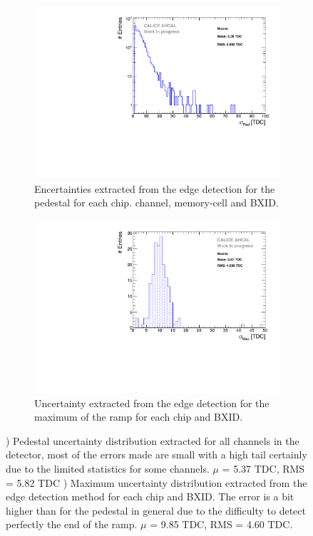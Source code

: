 \begin{figure}[thtbp!]
	\begin{subfigure}[t]{0.49\textwidth}
		\centering
		\includegraphics[width=1\linewidth]{chap5/fig_AHCAL_timing/Muons/PedestalErrorDistribution_AHCAL.pdf}
		\caption{Encertainties extracted from the edge detection for the pedestal for each chip. channel, memory-cell and BXID.} \label{fig:error_ped}
	\end{subfigure}
	\hfill
	\begin{subfigure}[t]{0.49\textwidth}
		\centering
		\includegraphics[width=1\linewidth]{chap5/fig_AHCAL_timing/Muons/MaxErrorDistribution_AHCAL.pdf}
		\caption{Uncertainty extracted from the edge detection for the maximum of the ramp for each chip and BXID.} \label{fig:error_max}
	\end{subfigure}
	\caption{) Pedestal uncertainty distribution extracted for all channels in the detector, most of the errors made are small with a high tail certainly due to the limited statistics for some channels. $\mu$ = 5.37 TDC, RMS = 5.82 TDC ) Maximum uncertainty distribution extracted from the edge detection method for each chip and BXID. The error is a bit higher than for the pedestal in general due to the difficulty to detect perfectly the end of the ramp. $\mu$ = 9.85 TDC, RMS = 4.60 TDC.}
\end{figure}


